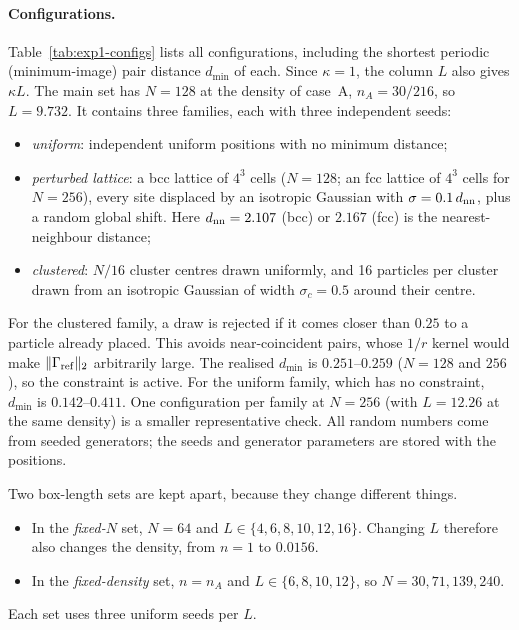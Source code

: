 \paragraph{Configurations.}
Table~\ref{tab:exp1-configs} lists all configurations, including the shortest periodic (minimum-image) pair distance
$d_{\min}$ of each. Since $\kappa=1$, the column $L$ also gives $\kappa L$. The main set has $N=128$ at the density of
case~A, $n_A=30/216$, so $L=9.732$. It contains three families, each with three independent seeds:
\begin{itemize}
\item \emph{uniform}: independent uniform positions with no minimum distance;
\item \emph{perturbed lattice}: a bcc lattice of $4^3$ cells ($N=128$; an fcc lattice of $4^3$ cells for $N=256$),
  every site displaced by an isotropic Gaussian with $\sigma=0.1\,d_{\rm nn}$, plus a random global shift. Here
  $d_{\rm nn}=2.107$ (bcc) or $2.167$ (fcc) is the nearest-neighbour distance;
\item \emph{clustered}: $N/16$ cluster centres drawn uniformly, and 16 particles per cluster drawn from an isotropic
  Gaussian of width $\sigma_c=0.5$ around their centre.
\end{itemize}
For the clustered family, a draw is rejected if it comes closer than $0.25$ to a particle already placed. This avoids
near-coincident pairs, whose $1/r$ kernel would make $\|\Gamma_{\rm ref}\|_2$ arbitrarily large. The realised
$d_{\min}$ is $0.251$--$0.259$ ($N=128$ and $256$), so the constraint is active. For the uniform family, which has no constraint, $d_{\min}$
is $0.142$--$0.411$. One configuration per family at $N=256$ (with $L=12.26$ at the same density) is a smaller
representative check. All random numbers come from seeded generators; the seeds and generator parameters are stored
with the positions.

Two box-length sets are kept apart, because they change different things.
\begin{itemize}
\item In the \emph{fixed-$N$} set, $N=64$ and $L\in\{4,6,8,10,12,16\}$. Changing $L$ therefore also changes the
  density, from $n=1$ to $0.0156$.
\item In the \emph{fixed-density} set, $n=n_A$ and $L\in\{6,8,10,12\}$, so $N=30,71,139,240$.
\end{itemize}
Each set uses three uniform seeds per $L$.

\begin{table}[t]
\centering\small
\caption{Static configurations of Experiment~1. $L$ is the edge length of the periodic cube, $n=N/L^3$ the number
density, $d_{\min}$ the smallest periodic pair distance (range over seeds), $\kappa=1$. A and B are the original two
dense-reference boxes.}
\label{tab:exp1-configs}

\end{table}


